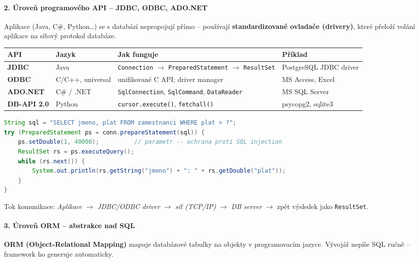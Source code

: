 \paragraph{2. Úroveň programového API -- JDBC, ODBC, ADO.NET}
Aplikace (Java, C\#, Python\ldots) se s databází nepropojují přímo -- používají
\textbf{standardizované ovladače (drivery)}, které přeloží volání aplikace na síťový protokol databáze.

\begin{center}
\begin{tabular}{p{2cm}p{2.5cm}p{6cm}p{2.5cm}}
\toprule
\textbf{API} & \textbf{Jazyk} & \textbf{Jak funguje} & \textbf{Příklad} \\
\midrule
\textbf{JDBC} & Java & \texttt{Connection} $\to$ \texttt{PreparedStatement} $\to$ \texttt{ResultSet} & PostgreSQL JDBC driver \\
\textbf{ODBC} & C/C++, universal & unifikované C API; driver manager & MS Access, Excel \\
\textbf{ADO.NET} & C\# / .NET & \texttt{SqlConnection}, \texttt{SqlCommand}, \texttt{DataReader} & MS SQL Server \\
\textbf{DB-API 2.0} & Python & \texttt{cursor.execute()}, \texttt{fetchall()} & psycopg2, sqlite3 \\
\bottomrule
\end{tabular}
\end{center}

\begin{lstlisting}[language=Java, caption=JDBC -- dotaz z Java aplikace]
String sql = "SELECT jmeno, plat FROM zamestnanci WHERE plat > ?";
try (PreparedStatement ps = conn.prepareStatement(sql)) {
    ps.setDouble(1, 40000);          // parametr -- ochrana proti SQL injection
    ResultSet rs = ps.executeQuery();
    while (rs.next()) {
        System.out.println(rs.getString("jmeno") + ": " + rs.getDouble("plat"));
    }
}
\end{lstlisting}

Tok komunikace: \textit{Aplikace} $\to$ \textit{JDBC/ODBC driver} $\to$ \textit{síť (TCP/IP)} $\to$
\textit{DB server} $\to$ zpět výsledek jako \texttt{ResultSet}.

\paragraph{3. Úroveň ORM -- abstrakce nad SQL}
\textbf{ORM (Object-Relational Mapping)} mapuje databázové tabulky na objekty v programovacím jazyce.
Vývojář nepíše SQL ručně -- framework ho generuje automaticky.

